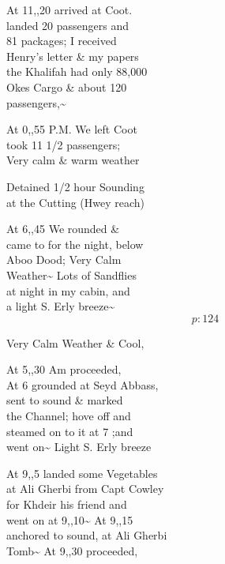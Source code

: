 \documentclass{report}
\begin{document}
	\par{
 	At 11,,20 arrived at Coot.\ \\landed 20 passengers and\ \\81 packages; I received\ \\Henry's letter \& my papers\ \\the Khalifah had only 88,000\ \\Okes Cargo \& about 120\ \\passengers,\~{}\ \\
	}

	\par{
 	At 0,,55 P.M. We left Coot\ \\took 11 1/2 passengers;\ \\Very calm \& warm weather\ \\
	}

	\par{
 	Detained 1/2 hour Sounding\ \\at the Cutting (Hwey reach)\ \\
	}

	\par{
 	At 6,,45 We rounded \&\ \\came to for the night, below\ \\Aboo Dood; Very Calm\ \\Weather\~{} Lots of Sandflies\ \\at night in my cabin, and\ \\a light S. Erly breeze\~{}\ \\
  \[p: 124 \]

	}


	\par{
 	Very Calm Weather \& Cool,\ \\
	}

	\par{
 	At 5,,30 Am proceeded,\ \\At 6 grounded at Seyd Abbass,\ \\sent to sound \& marked\ \\the Channel; hove off and\ \\steamed on to it at 7 ;and\ \\went on\~{} Light S. Erly breeze\ \\
	}

	\par{
 	At 9,,5 landed some Vegetables\ \\at Ali Gherbi from Capt Cowley\ \\for Khdeir his friend and\ \\went on at 9,,10\~{} At 9,,15\ \\anchored to sound, at Ali Gherbi\ \\Tomb\~{} At 9,,30 proceeded,\ \\
	}
\end{document}
